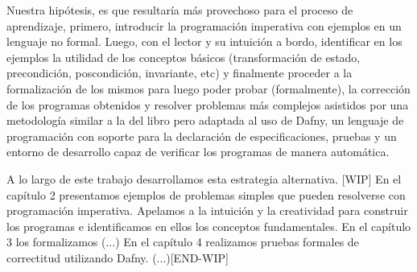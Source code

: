 \documentclass[12pt, a4paper, openany, fleqn]{book}
\begin{document}
    Nuestra hipótesis, es que resultaría más provechoso para el proceso de aprendizaje, primero, introducir la programación imperativa con ejemplos en un lenguaje no formal. Luego, con el lector y su intuición a bordo, identificar en los ejemplos la utilidad de los conceptos básicos (transformación de estado, precondición, poscondición, invariante, etc) y finalmente proceder a la formalización de los mismos para luego poder probar (formalmente), la corrección de los programas obtenidos y resolver problemas más complejos asistidos por una metodología similar a la del libro pero adaptada al uso de Dafny, un lenguaje de programación con soporte para la declaración de especificaciones, pruebas y un entorno de desarrollo capaz de verificar los programas de manera automática.

    A lo largo de este trabajo desarrollamos esta estrategia alternativa.
    [WIP]
    En el capítulo 2 presentamos ejemplos de problemas simples que pueden resolverse con programación imperativa. Apelamos a la intuición y la creatividad para construir los programas e identificamos en ellos los conceptos fundamentales.
    En el capítulo 3 los formalizamos (...)
    En el capítulo 4 realizamos pruebas formales de correctitud utilizando Dafny. (...)[END-WIP]

    
    
\end{document}
